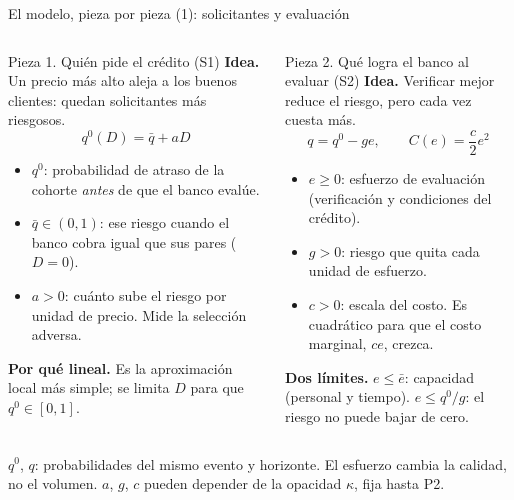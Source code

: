 \documentclass[aspectratio=169,10pt,t]{beamer}
\newcommand{\source}[1]{\par\vfill{\fontsize{6}{7.2}\selectfont\color{soft}#1\par}}
\newcommand{\qz}{q^{0}}
\newcommand{\eb}{\bar e}
\begin{document}
\begin{frame}{El modelo, pieza por pieza (1): solicitantes y evaluación}
\vspace{-1mm}
\begin{columns}[T,onlytextwidth]
\begin{propbox}{Pieza 1. Quién pide el crédito (S1)}
\small
\textbf{Idea.} Un precio más alto aleja a los buenos clientes: quedan solicitantes
más riesgosos.
\[\qz(D)=\bar q+aD\]
\vspace{-4.5mm}
\begin{itemize}\setlength{\itemsep}{.4mm}
\item $\qz$: probabilidad de atraso de la cohorte \emph{antes} de que el banco evalúe.
\item $\bar q\in(0,1)$: ese riesgo cuando el banco cobra igual que sus pares ($D=0$).
\item $a>0$: cuánto sube el riesgo por unidad de precio. Mide la selección adversa.
\end{itemize}
\textbf{Por qué lineal.} Es la aproximación local más simple; se limita $D$ para que
$\qz\in[0,1]$.
\end{propbox}
\begin{propbox}{Pieza 2. Qué logra el banco al evaluar (S2)}
\small
\textbf{Idea.} Verificar mejor reduce el riesgo, pero cada vez cuesta más.
\[q=\qz-ge,\qquad C(e)=\frac{c}{2}e^{2}\]
\vspace{-4.5mm}
\begin{itemize}\setlength{\itemsep}{.4mm}
\item $e\ge 0$: esfuerzo de evaluación (verificación y condiciones del crédito).
\item $g>0$: riesgo que quita cada unidad de esfuerzo.
\item $c>0$: escala del costo. Es cuadrático para que el costo marginal, $ce$, crezca.
\end{itemize}
\textbf{Dos límites.} $e\le\eb$: capacidad (personal y tiempo). $e\le \qz/g$: el
riesgo no puede bajar de cero.
\end{propbox}
\end{columns}
\source{$\qz$, $q$: probabilidades del mismo evento y horizonte. El esfuerzo cambia la
calidad, no el volumen. $a$, $g$, $c$ pueden depender de la opacidad $\kappa$, fija hasta P2.}
\end{frame}
\end{document}
